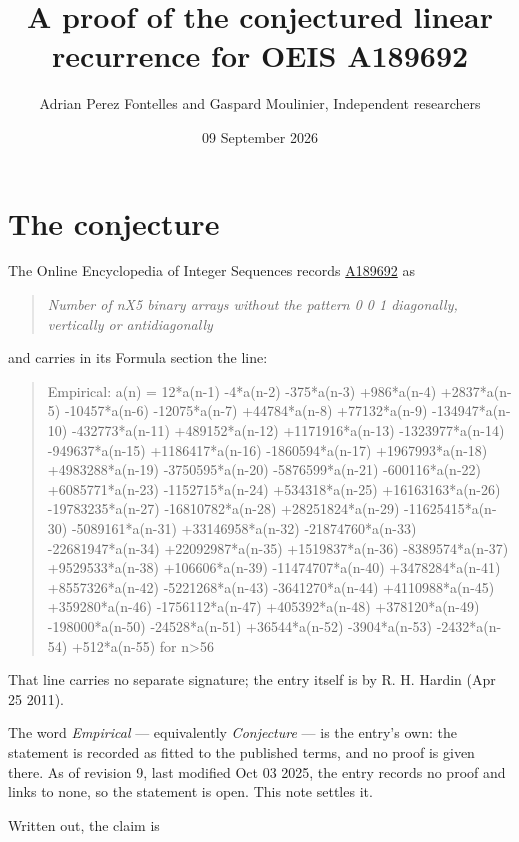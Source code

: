 \documentclass[11pt]{article}
\title{A proof of the conjectured linear recurrence for OEIS A189692}
\author{Adrian Perez Fontelles and Gaspard Moulinier, Independent researchers}
\date{09 September 2026}
\theoremstyle{definition}
\begin{document}
\maketitle
\section{The conjecture}

The Online Encyclopedia of Integer Sequences records \href{https://oeis.org/A189692}{A189692} as

\begin{quote}\itshape Number of nX5 binary arrays without the pattern 0 0 1 diagonally, vertically or antidiagonally\end{quote}

and carries in its Formula section the line:

\begin{quote}\ttfamily Empirical: a(n) = 12*a(n-1) -4*a(n-2) -375*a(n-3) +986*a(n-4) +2837*a(n-5) -10457*a(n-6) -12075*a(n-7) +44784*a(n-8) +77132*a(n-9) -134947*a(n-10) -432773*a(n-11) +489152*a(n-12) +1171916*a(n-13) -1323977*a(n-14) -949637*a(n-15) +1186417*a(n-16) -1860594*a(n-17) +1967993*a(n-18) +4983288*a(n-19) -3750595*a(n-20) -5876599*a(n-21) -600116*a(n-22) +6085771*a(n-23) -1152715*a(n-24) +534318*a(n-25) +16163163*a(n-26) -19783235*a(n-27) -16810782*a(n-28) +28251824*a(n-29) -11625415*a(n-30) -5089161*a(n-31) +33146958*a(n-32) -21874760*a(n-33) -22681947*a(n-34) +22092987*a(n-35) +1519837*a(n-36) -8389574*a(n-37) +9529533*a(n-38) +106606*a(n-39) -11474707*a(n-40) +3478284*a(n-41) +8557326*a(n-42) -5221268*a(n-43) -3641270*a(n-44) +4110988*a(n-45) +359280*a(n-46) -1756112*a(n-47) +405392*a(n-48) +378120*a(n-49) -198000*a(n-50) -24528*a(n-51) +36544*a(n-52) -3904*a(n-53) -2432*a(n-54) +512*a(n-55) for n>56\end{quote}

That line carries no separate signature; the entry itself is by R. H. Hardin (Apr 25 2011).

The word {\itshape Empirical} --- equivalently {\itshape Conjecture} --- is the entry's own: the statement is recorded as fitted to the published terms, and no proof is given there. As of revision 9, last modified Oct 03 2025, the entry records no proof and links to none, so the statement is open. This note settles it.

Written out, the claim is
\end{document}
